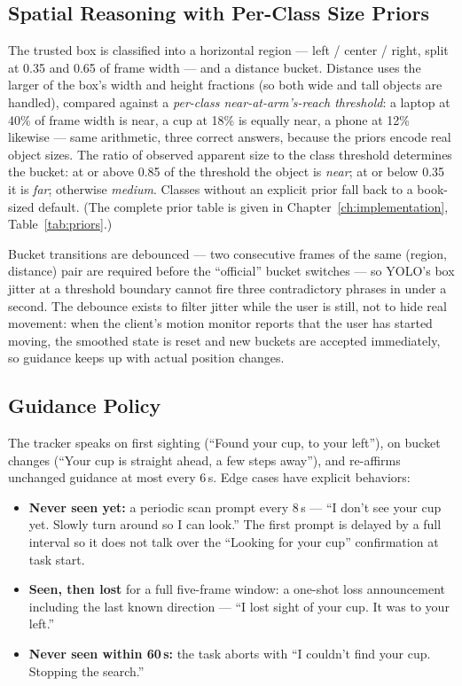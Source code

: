\subsection{Spatial Reasoning with Per-Class Size Priors}
\label{sec:spatial_reasoning_task}

The trusted box is classified into a horizontal region --- left / center / right,
split at 0.35 and 0.65 of frame width --- and a distance bucket. Distance uses the
larger of the box's width and height fractions (so both wide and tall objects are
handled), compared against a \emph{per-class near-at-arm's-reach threshold}: a
laptop at 40\% of frame width is near, a cup at 18\% is equally near, a phone at
12\% likewise --- same arithmetic, three correct answers, because the priors encode
real object sizes. The ratio of observed apparent size to the class threshold
determines the bucket: at or above 0.85 of the threshold the object is \emph{near};
at or below 0.35 it is \emph{far}; otherwise \emph{medium}. Classes without an
explicit prior fall back to a book-sized default. (The complete prior table is
given in Chapter~\ref{ch:implementation}, Table~\ref{tab:priors}.)

Bucket transitions are debounced --- two consecutive frames of the same
(region, distance) pair are required before the ``official'' bucket switches --- so
YOLO's box jitter at a threshold boundary cannot fire three contradictory phrases
in under a second. The debounce exists to filter jitter while the user is still,
not to hide real movement: when the client's motion monitor reports that the user
has started moving, the smoothed state is reset and new buckets are accepted
immediately, so guidance keeps up with actual position changes.

\subsection{Guidance Policy}

The tracker speaks on first sighting (``Found your cup, to your left''), on bucket
changes (``Your cup is straight ahead, a few steps away''), and re-affirms unchanged
guidance at most every 6\,s. Edge cases have explicit behaviors:

\begin{itemize}[nosep]
  \item \textbf{Never seen yet:} a periodic scan prompt every 8\,s --- ``I don't
        see your cup yet. Slowly turn around so I can look.'' The first prompt is
        delayed by a full interval so it does not talk over the ``Looking for your
        cup'' confirmation at task start.
  \item \textbf{Seen, then lost} for a full five-frame window: a one-shot loss
        announcement including the last known direction --- ``I lost sight of your
        cup. It was to your left.''
  \item \textbf{Never seen within 60\,s:} the task aborts with ``I couldn't find
        your cup. Stopping the search.''
\end{itemize}

